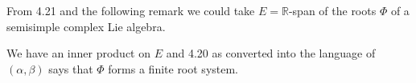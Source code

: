 From 4.21 and the following remark we could take
$E = \mathbb{R}$-span of the roots $\Phi$ of a semisimple
complex Lie algebra.

We have an inner product on $E$ and 4.20 as converted into the
language of $(\alpha, \beta)$ says that $\Phi$ forms a finite root
system.
